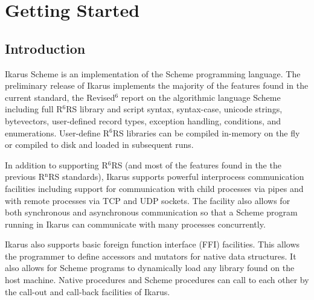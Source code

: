 \documentclass[onecolumn, 12pt, twoside, openright, dvipdfm]{book}
\newcommand{\rnrs}[1]{R$^{\mathrm{#1}}$RS}
\begin{document}
\newpage

\pagestyle{fancy}
{}
\tableofcontents

\newpage

\mainmatter
\setlength{\parindent}{0pt} 
\setlength{\parskip}{2.0ex plus 0ex minus 0ex}
\chapter{Getting Started}
\section{Introduction}

Ikarus Scheme is an implementation of the Scheme programming
language.  The preliminary release of Ikarus implements the majority
of the features found in the current standard, the
Revised$^\mathrm{6}$ report on the algorithmic language
Scheme\cite{r6rs} including full \rnrs{6} library and script syntax,
syntax-case, unicode strings, bytevectors, user-defined record
types, exception handling, conditions, and enumerations.
User-define \rnrs{6} libraries can be compiled in-memory on the fly
or compiled to disk and loaded in subsequent runs.

In addition to supporting \rnrs{6} (and most of the features found
in the the previous \rnrs{n} standards), Ikarus supports powerful
interprocess communication facilities including support for
communication with child processes via pipes and with remote
processes via TCP and UDP sockets.  The facility also allows for
both synchronous and asynchronous communication so that a Scheme
program running in Ikarus can communicate with many processes
concurrently.

Ikarus also supports basic foreign function interface (FFI)
facilities.  This allows the programmer to define accessors and
mutators for native data structures.  It also allows for Scheme
programs to dynamically load any library found on the host machine.
Native procedures and Scheme procedures can call to each other by
the call-out and call-back facilities of Ikarus.

\end{document}
